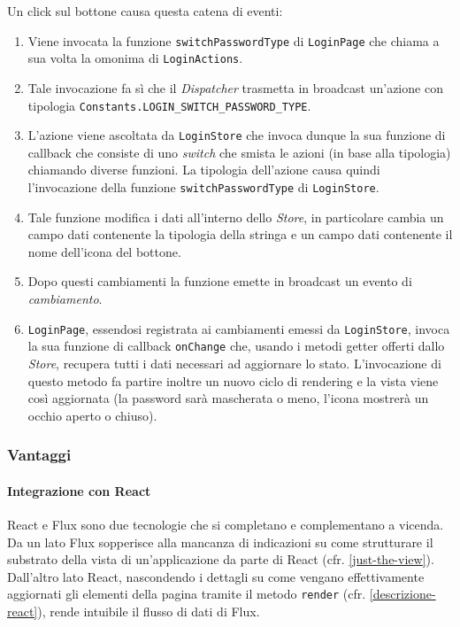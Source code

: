Un click sul bottone causa questa catena di eventi:

\begin{enumerate}
\item Viene invocata la funzione \texttt{switchPasswordType} di \texttt{LoginPage} che
chiama a sua volta la omonima di \texttt{LoginActions}.
\item Tale invocazione fa sì che il \textit{Dispatcher} trasmetta in broadcast un'azione con
tipologia \texttt{Constants.LOGIN\_SWITCH\_PASSWORD\_TYPE}.
\item L'azione viene ascoltata da \texttt{LoginStore} che invoca dunque la sua funzione
di callback che consiste di uno \textit{switch} che smista le azioni (in base alla tipologia)
chiamando diverse funzioni. La tipologia dell'azione causa quindi l'invocazione della
funzione \texttt{switchPasswordType} di \texttt{LoginStore}.
\item Tale funzione modifica i dati all'interno dello \textit{Store}, in particolare cambia un
campo dati contenente la tipologia della stringa e un campo dati contenente il nome
dell'icona del bottone.
\item Dopo questi cambiamenti la funzione emette in broadcast un evento di \textit{cambiamento}.
\item \texttt{LoginPage}, essendosi registrata ai cambiamenti emessi da \texttt{LoginStore},
invoca la sua funzione di callback \texttt{onChange} che, usando i metodi getter offerti dallo
\textit{Store}, recupera tutti i dati necessari ad aggiornare lo stato. L'invocazione di questo metodo
fa partire inoltre un nuovo ciclo di rendering e la vista viene così aggiornata (la password
sarà mascherata o meno, l'icona mostrerà un occhio aperto o chiuso).
\end{enumerate}


\subsubsection{Vantaggi}

\paragraph{Integrazione con React}
React e Flux sono due tecnologie che si completano e complementano a vicenda. Da un lato
Flux sopperisce alla mancanza di indicazioni su come strutturare il substrato della vista
di un'applicazione da parte di React (cfr. \ref{just-the-view}). Dall'altro lato React,
nascondendo i dettagli su come vengano effettivamente aggiornati gli elementi della pagina
tramite il metodo \texttt{render} (cfr. \ref{descrizione-react}), rende intuibile il flusso
di dati di Flux.

